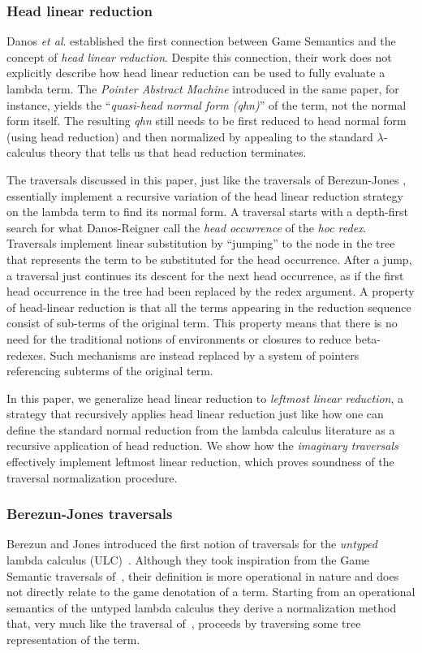 \documentclass{elsarticle}
\theoremstyle{plain}
\theoremstyle{definition}
\theoremstyle{remark}
\newcommand{\etal}{\textit{et al}. }
\begin{document}
\subsubsection{Head linear reduction}
Danos \etal established the first connection between Game Semantics and the concept of \emph{head linear reduction}\cite{danos-head,danosherbelinregnier1996}. Despite this connection, their work does not explicitly describe how head linear reduction can be used to fully evaluate a lambda term. The \emph{Pointer Abstract Machine} introduced in the same paper, for instance, yields the ``\emph{quasi-head normal form (qhn)}'' of the term, not the normal form itself. The resulting \emph{qhn} still needs to be first reduced to head normal form (using head reduction) and then normalized by appealing to the standard $\lambda$-calculus theory that tells us that head reduction terminates.

The traversals discussed in this paper, just like the traversals of Berezun-Jones \cite{JonesBerezunLLL}, essentially implement
a recursive variation of the head linear reduction strategy on the lambda term to find its normal form. A traversal starts with a depth-first search for what Danos-Reigner call the \emph{head occurrence} of the \emph{hoc redex}. Traversals implement linear substitution by ``jumping'' to the node in the tree that represents the term to be substituted for the head occurrence. After a jump, a traversal just continues its descent for the next head occurrence, as if the first head occurrence in the tree had been replaced by the redex argument. A property of head-linear reduction is that all the terms appearing in the reduction sequence consist of sub-terms of the original term. This property means that there is no need for the traditional notions of environments or closures to reduce beta-redexes. Such mechanisms are instead replaced by a system of pointers referencing subterms of the original term.

In this paper, we generalize head linear reduction to \emph{leftmost linear reduction}, a strategy that recursively applies head linear reduction just like how one can define the standard normal reduction from the lambda calculus literature as a recursive application of head reduction.
We show how the \emph{imaginary traversals} effectively implement  leftmost linear reduction, which proves soundness of the traversal normalization procedure.


\subsubsection{Berezun-Jones traversals}
Berezun and Jones introduced the first notion of traversals for the \emph{untyped} lambda calculus (ULC)~\cite{JonesBerezunLLL}. Although they took inspiration from the Game Semantic traversals of~\cite{Ong2006,BlumGalop2008}, their definition is more operational in nature and does not directly relate to the game denotation of a term. Starting from an operational semantics of the untyped lambda calculus they derive a normalization method that, very much like the traversal of~\cite{Ong2006, BlumPhd}, proceeds by traversing some tree representation of the term.
\end{document}
